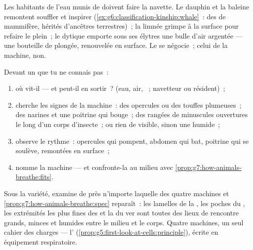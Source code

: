 \begin{example}\label{ex:g7:how-animals-breathe:airinwater}
Les habitants de l'eau munis de  doivent faire la navette. Le
dauphin et la baleine remontent souffler et inspirer
(\cref{ex:g6:classification-kinship:whale}~: des  de
mammifère, hérités d'ancêtres terrestres)~; la limnée grimpe à la
surface pour refaire le plein~; le dytique emporte sous ses élytres
une bulle d'air argentée --- une bouteille de plongée, renouvelée en
surface. Le  se négocie~; celui de la machine, non.
\end{example}

\begin{method}\label{met:g7:how-animals-breathe:read}
Devant un  que tu ne connais pas~:
\begin{enumerate}
  \item où vit-il --- et peut-il en sortir~? (eau, air, ~;
        navetteur ou résident)~;
  \item cherche les signes de la machine~: des opercules ou des
        touffes plumeuses~; des narines et une poitrine qui bouge~;
        des rangées de minuscules ouvertures le long d'un corps
        d'insecte~; ou rien de visible, sinon une  humide~;
  \item observe le rythme~: opercules qui pompent, abdomen qui bat,
        poitrine qui se soulève, remontées en surface~;
  \item nomme la machine --- et confronte-la au milieu avec
        \cref{prop:g7:how-animals-breathe:fits}.
\end{enumerate}
\end{method}

\begin{remark}\label{rem:g7:how-animals-breathe:same}
Sous la variété, examine de près n'importe laquelle des quatre
machines et \cref{prop:g7:how-animals-breathe:spec} reparaît~: les
lamelles de la , les poches du , les extrémités les
plus fines des  et la  du ver sont toutes des lieux de
rencontre grands, minces et humides entre le milieu et le corps.
Quatre machines, un seul cahier des charges --- l'
(\cref{prop:g5:first-look-at-cells:principle}), écrite en
équipement respiratoire.
\end{remark}

